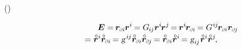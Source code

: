 \vspace{-0.2em}\noindent
{}
~()

\nopagebreak\vspace{-0.4em}
\begin{multline*}
\shoveleft{
   \hspace{3em} \UnitDyad
   = \hspace{-0.2ex}
   \currentlocationvector_\differentialindex{i} \hspace{-0.1ex} \currentlocationvector^{i}
   \hspace{-0.2ex} =
   G_{\hspace{-0.15ex}i\hspace{-0.1ex}j} \currentlocationvector^{i} \hspace{-0.2ex} \currentlocationvector^j
   \hspace{-0.25ex} = \hspace{-0.2ex}
   \currentlocationvector^{i} \hspace{-0.2ex} \currentlocationvector_\differentialindex{i}
   \hspace{-0.2ex} =
   G^{\hspace{.1ex}i\hspace{-0.1ex}j} \hspace{-0.2ex} \currentlocationvector_\differentialindex{i} \currentlocationvector_\differentialindex{\hspace{-0.1ex}j}
\hfill }
\\[-0.2em]
%
= \initiallocationvector^i \initiallocationvector_\differentialindex{i} \hspace{-0.2ex}
= \textsl{g}^{\hspace{.2ex}i\hspace{-0.1ex}j} \initiallocationvector_\differentialindex{i} \initiallocationvector_\differentialindex{\hspace{-0.1ex}j} \hspace{-0.2ex}
= \initiallocationvector_\differentialindex{i} \initiallocationvector^i \hspace{-0.25ex}
= \textsl{g}_{i\hspace{-0.1ex}j} \hspace{.1ex} \initiallocationvector^i \initiallocationvector^j
\hspace{-0.2ex} ,
\end{multline*}

